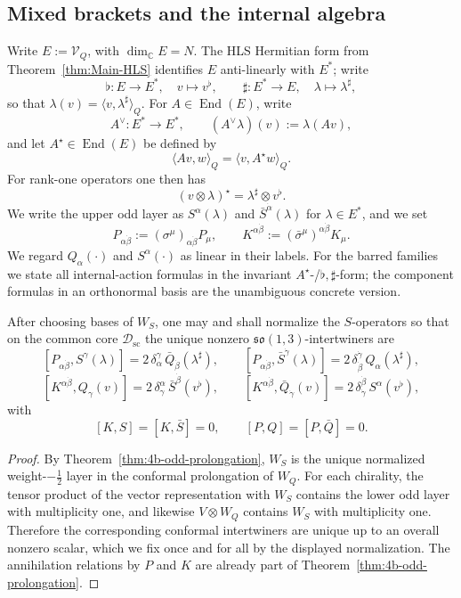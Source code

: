 \subsection{Mixed brackets and the internal algebra}
\label{subsec:4b-internal}

Write \(E:=\mathcal V_Q\), with \(\dim_\mathbb C E=N\). The HLS Hermitian form
from Theorem~\ref{thm:Main-HLS} identifies \(E\) anti-linearly with \(E^*\); write
\[
  \flat:E\to E^*,
  \quad
  v\mapsto v^\flat,
  \qquad
  \sharp:E^*\to E,
  \quad
  \lambda\mapsto \lambda^\sharp,
\]
so that \(\lambda(v)=\langle v,\lambda^\sharp\rangle_Q\). For
\(A\in\operatorname{End}(E)\), write
\[
  A^\vee:E^*\to E^*,
  \qquad
  (A^\vee\lambda)(v):=\lambda(Av),
\]
and let \(A^\star\in\operatorname{End}(E)\) be defined by
\[
  \langle Av,w\rangle_Q=\langle v,A^\star w\rangle_Q.
\]
For rank-one operators one then has
\[
  (v\otimes\lambda)^\star=\lambda^\sharp\otimes v^\flat.
\]
We write the upper odd
layer as \(S^\alpha(\lambda)\) and \(\bar S^{\dot\alpha}(\lambda)\) for
\(\lambda\in E^*\), and we set
\[
  P_{\alpha\dot\beta}:=(\sigma^\mu)_{\alpha\dot\beta}P_\mu,
  \qquad
  K^{\alpha\dot\beta}:=(\bar\sigma^\mu)^{\alpha\dot\beta}K_\mu.
\]
We regard \(Q_\alpha(\cdot)\) and \(S^\alpha(\cdot)\) as linear in their labels.
For the barred families we state all internal-action formulas in the invariant
\(A^\star\)-/\(\flat,\sharp\)-form; the component formulas in an orthonormal basis
are the unambiguous concrete version.

\begin{lemma}
\label{lem:4b-upper-odd-normalization}
After choosing bases of \(W_S\), one may and shall normalize the \(S\)-operators
so that on the common core \(\mathcal D_{\mathrm{sc}}\) the unique nonzero
\(\mathfrak{so}(1,3)\)-intertwiners are
\[
  [P_{\alpha\dot\beta},S^\gamma(\lambda)]
  =
  2\,\delta_\alpha^\gamma\,\bar Q_{\dot\beta}(\lambda^\sharp),
  \qquad
  [P_{\alpha\dot\beta},\bar S^{\dot\gamma}(\lambda)]
  =
  2\,\delta_{\dot\beta}^{\dot\gamma}\,Q_\alpha(\lambda^\sharp),
\]
\[
  [K^{\alpha\dot\beta},Q_\gamma(v)]
  =
  2\,\delta_\gamma^\alpha\,\bar S^{\dot\beta}(v^\flat),
  \qquad
  [K^{\alpha\dot\beta},\bar Q_{\dot\gamma}(v)]
  =
  2\,\delta_{\dot\gamma}^{\dot\beta}\,S^\alpha(v^\flat),
\]
with
\[
  [K,S]=[K,\bar S]=0,
  \qquad
  [P,Q]=[P,\bar Q]=0.
\]
\end{lemma}

\begin{proof}
By Theorem~\ref{thm:4b-odd-prolongation}, \(W_S\) is the unique normalized
weight-\(-\tfrac12\) layer in the conformal prolongation of \(W_Q\). For each chirality,
the tensor product of the vector representation with \(W_S\) contains the lower
odd layer with multiplicity one, and likewise \(V\otimes W_Q\) contains \(W_S\)
with multiplicity one. Therefore the corresponding conformal intertwiners are
unique up to an overall nonzero scalar, which we fix once and for all by the
displayed normalization. The annihilation relations by \(P\) and \(K\) are already
part of Theorem~\ref{thm:4b-odd-prolongation}.
\end{proof}

